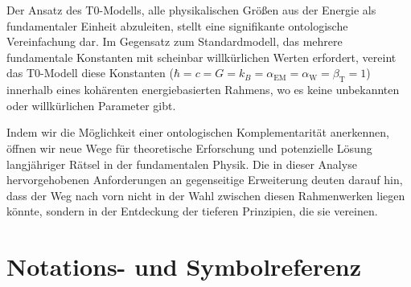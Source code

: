 \documentclass[12pt,a4paper]{article}
\newcommand{\betaT}{\beta_{\text{T}}}
\newcommand{\alphaEM}{\alpha_{\text{EM}}}
\newcommand{\alphaW}{\alpha_{\text{W}}}
\begin{document}
	Der Ansatz des T0-Modells, alle physikalischen Größen aus der Energie als fundamentaler Einheit abzuleiten, stellt eine signifikante ontologische Vereinfachung dar. Im Gegensatz zum Standardmodell, das mehrere fundamentale Konstanten mit scheinbar willkürlichen Werten erfordert, vereint das T0-Modell diese Konstanten ($\hbar = c = G = k_B = \alphaEM = \alphaW = \betaT = 1$) innerhalb eines kohärenten energiebasierten Rahmens, wo es keine unbekannten oder willkürlichen Parameter gibt.
	
	Indem wir die Möglichkeit einer ontologischen Komplementarität anerkennen, öffnen wir neue Wege für theoretische Erforschung und potenzielle Lösung langjähriger Rätsel in der fundamentalen Physik. Die in dieser Analyse hervorgehobenen Anforderungen an gegenseitige Erweiterung deuten darauf hin, dass der Weg nach vorn nicht in der Wahl zwischen diesen Rahmenwerken liegen könnte, sondern in der Entdeckung der tieferen Prinzipien, die sie vereinen.
	
	\section{Notations- und Symbolreferenz}
	
\end{document}
